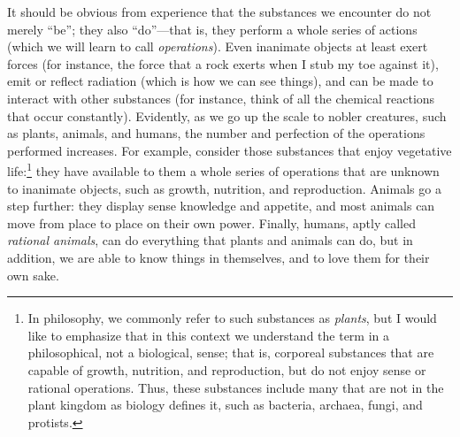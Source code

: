 \documentclass[article,12pt,a4paper,oneside]{memoir}
\begin{document}
    It should be obvious from experience that the substances we
    encounter do not merely ``be''; they also ``do''---that is, they
    perform a whole series of actions (which we will learn to call
    \emph{operations}). Even inanimate objects at least exert forces
    (for instance, the force that a rock exerts when I stub my toe
    against it), emit or reflect radiation (which is how we can see
    things), and can be made to interact with other substances (for
    instance, think of all the chemical reactions that occur
    constantly). Evidently, as we go up the scale to nobler creatures,
    such as plants, animals, and humans, the number and perfection of
    the operations performed increases. For example, consider those
    substances that enjoy vegetative life:\footnote{In philosophy, we
      commonly refer to such substances as \emph{plants}, but I would
      like to emphasize that in this context we understand the term in a
      philosophical, not a biological, sense; that is, corporeal
      substances that are capable of growth, nutrition, and
      reproduction, but do not enjoy sense or rational operations. Thus,
      these substances include many that are not in the plant kingdom as
      biology defines it, such as bacteria, archaea, fungi, and
      protists.} they have available to them a whole series of
    operations that are unknown to inanimate objects, such as growth,
    nutrition, and reproduction. Animals go a step further: they display
    sense knowledge and appetite, and most animals can move from place
    to place on their own power. Finally, humans, aptly called
    \emph{rational animals}, can do everything that plants and animals
    can do, but in addition, we are able to know things in themselves,
    and to love them for their own sake.
\end{document}

